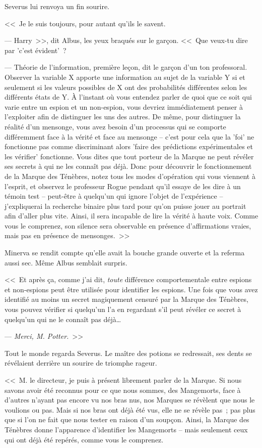 Severus lui renvoya un fin sourire.

<<~Je le suis toujours, pour autant qu'ils le savent.

--- Harry~>>, dit Albus, les yeux braqués sur le garçon. <<~Que veux-tu dire par 'c'est évident'~?

--- Théorie de l'information, première leçon, dit le garçon d'un ton professoral. Observer la variable X apporte une information au sujet de la variable Y si et seulement si les valeurs possibles de X ont des probabilités différentes selon les différents états de Y. À l'instant où vous entendez parler de quoi que ce soit qui varie entre un espion et un non-espion, vous devriez immédiatement penser à l'exploiter afin de distinguer les uns des autres. De même, pour distinguer la réalité d'un mensonge, vous avez besoin d'un processus qui se comporte différemment face à la vérité et face au mensonge -- c'est pour cela que la 'foi' ne fonctionne pas comme discriminant alors 'faire des prédictions expérimentales et les vérifier' fonctionne. Vous dites que tout porteur de la Marque ne peut révéler ses secrets à qui ne les connaît pas déjà. Donc pour découvrir le fonctionnement de la Marque des Ténèbres, notez tous les modes d'opération qui vous viennent à l'esprit, et observez le professeur Rogue pendant qu'il essaye de les dire à un témoin test -- peut-être à quelqu'un qui ignore l'objet de l'expérience -- j'expliquerai la recherche binaire plus tard pour qu'on puisse jouer au portrait afin d'aller plus vite. Ainsi, il sera incapable de lire la vérité à haute voix. Comme vous le comprenez, son silence sera observable en présence d'affirmations vraies, mais pas en présence de mensonges.~>>

Minerva se rendit compte qu'elle avait la bouche grande ouverte et la referma aussi sec. Même Albus semblait surpris.

<<~Et après ça, comme j'ai dit, \emph{toute} différence comportementale entre espions et non-espions peut être utilisée pour identifier les espions. Une fois que vous avez identifié au moins un secret magiquement censuré par la Marque des Ténèbres, vous pouvez vérifier si quelqu'un l'a en regardant s'il peut révéler ce secret à quelqu'un qui ne le connaît pas déjà…

--- \emph{Merci, M. Potter.}~>>

Tout le monde regarda Severus. Le maître des potions se redressait, ses dents se révélaient derrière un sourire de triomphe rageur.

<<~M. le directeur, je puis à présent librement parler de la Marque. Si nous savons avoir été reconnus pour ce que nous sommes, des Mangemorts, face à d'autres n'ayant pas encore vu nos bras nus, nos Marques se révèlent que nous le voulions ou pas. Mais si nos bras ont déjà été vus, elle ne se révèle pas~; pas plus que si l'on ne fait que nous tester en raison d'un soupçon. Ainsi, la Marque des Ténèbres donne l'apparence d'identifier les Mangemorts -- mais seulement ceux qui ont déjà été repérés, comme vous le comprenez.

